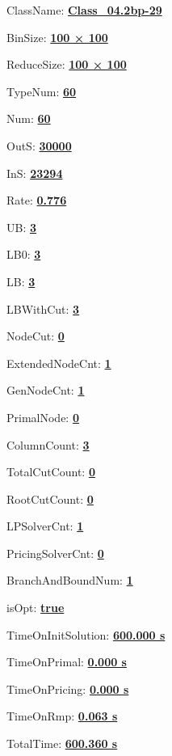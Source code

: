 \documentclass[11pt]{article}
\begin{document}
\pagestyle{empty}


ClassName: \underline{\textbf{Class_04.2bp-29}}
\par
BinSize: \underline{\textbf{100 × 100}}
\par
ReduceSize: \underline{\textbf{100 × 100}}
\par
TypeNum: \underline{\textbf{60}}
\par
Num: \underline{\textbf{60}}
\par
OutS: \underline{\textbf{30000}}
\par
InS: \underline{\textbf{23294}}
\par
Rate: \underline{\textbf{0.776}}
\par
UB: \underline{\textbf{3}}
\par
LB0: \underline{\textbf{3}}
\par
LB: \underline{\textbf{3}}
\par
LBWithCut: \underline{\textbf{3}}
\par
NodeCut: \underline{\textbf{0}}
\par
ExtendedNodeCnt: \underline{\textbf{1}}
\par
GenNodeCnt: \underline{\textbf{1}}
\par
PrimalNode: \underline{\textbf{0}}
\par
ColumnCount: \underline{\textbf{3}}
\par
TotalCutCount: \underline{\textbf{0}}
\par
RootCutCount: \underline{\textbf{0}}
\par
LPSolverCnt: \underline{\textbf{1}}
\par
PricingSolverCnt: \underline{\textbf{0}}
\par
BranchAndBoundNum: \underline{\textbf{1}}
\par
isOpt: \underline{\textbf{true}}
\par
TimeOnInitSolution: \underline{\textbf{600.000 s}}
\par
TimeOnPrimal: \underline{\textbf{0.000 s}}
\par
TimeOnPricing: \underline{\textbf{0.000 s}}
\par
TimeOnRmp: \underline{\textbf{0.063 s}}
\par
TotalTime: \underline{\textbf{600.360 s}}
\par
\newpage
\end{document}
